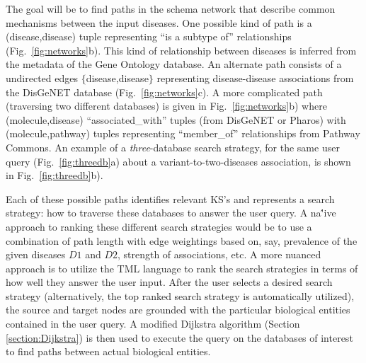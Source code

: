 \documentclass[11pt,notitlepage]{article}
\begin{document}
The goal will be to find paths in the schema network that describe common mechanisms between the input diseases. One possible kind of path is a (disease,disease) tuple representing ``is a subtype of'' relationships (Fig.~\ref{fig:networks}b). This kind of relationship between diseases is inferred from the metadata of the Gene Ontology database. An alternate path consists of a undirected edges $\{$disease,disease$\}$ representing disease-disease associations from the DisGeNET database (Fig.~\ref{fig:networks}c). A more complicated path (traversing two different databases) is given in Fig.~\ref{fig:networks}b) where  (molecule,disease) ``associated\_with'' tuples (from DisGeNET or Pharos) with (molecule,pathway) tuples representing ``member\_of'' relationships from Pathway Commons. An example of a {\em three}-database search strategy, for the same user query (Fig.~\ref{fig:threedb}a) about a variant-to-two-diseases association, is shown in Fig.~\ref{fig:threedb}b).

Each of these possible paths identifies relevant KS's and represents a search strategy: how to traverse these databases to answer the user query. A na\''ive approach to ranking these different search strategies would be to use a combination of path length with edge weightings based on, say, prevalence of the given diseases $D1$ and $D2$,  strength of associations, etc. A more nuanced approach is to utilize the TML language \citet{Domingos:2012wi} to rank the search strategies in terms of how well they answer the user input. After the user selects a desired search strategy (alternatively, the top ranked search strategy is automatically utilized), the source and target nodes are grounded with the particular biological entities contained in the user query. A modified Dijkstra algorithm (Section \ref{section:Dijkstra}) is then used to execute the query on the databases of interest to find paths between actual biological entities.

\end{document}
